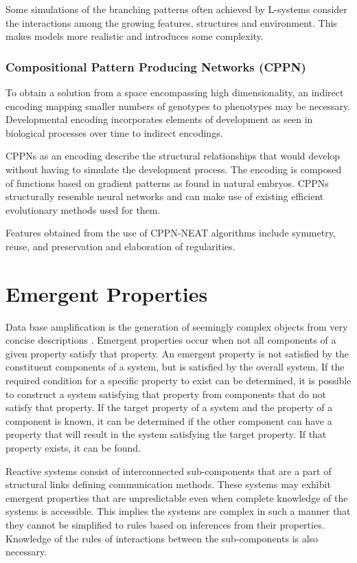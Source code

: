 Some simulations of the branching patterns often achieved by L-systems consider the interactions among the growing features, structures and environment. This makes models more realistic and introduces some complexity. \citep{Prusinkiewicz2004}

\subsubsection{Compositional Pattern Producing Networks (CPPN)}

To obtain a solution from a space encompassing high dimensionality, an indirect encoding mapping smaller numbers of genotypes to phenotypes may be necessary. Developmental encoding incorporates elements of development as seen in biological processes over time to indirect encodings. \citep{Hornby2001}

CPPNs as an encoding describe the structural relationships that would develop without having to simulate the development process. The encoding is composed of functions based on gradient patterns as found in natural embryos. CPPNs structurally resemble neural networks and can make use of existing efficient evolutionary methods used for them. \citep{Stanley2006}

Features obtained from the use of CPPN-NEAT algorithms include symmetry, reuse, and preservation and elaboration of regularities. \citep{Stanley2006}

\section{Emergent Properties}

Data base amplification is the generation of seemingly complex objects from very concise descriptions \citep{Prusinkiewicz2004}. Emergent properties occur when not all components of a given property satisfy that property. An emergent property is not satisfied by the constituent components of a system, but is satisfied by the overall system. If the required condition for a specific property to exist can be determined, it is possible to construct a system satisfying that property from components that do not satisfy that property. If the target property of a system and the property of a component is known, it can be determined if the other component can have a property that will result in the system satisfying the target property. If that property exists, it can be found. \citep{Zakinthinos1998}

Reactive systems consist of interconnected sub-components that are a part of structural links defining communication methods. These systems may exhibit emergent properties that are unpredictable even when complete knowledge of the systems is accessible. This implies the systems are complex in such a manner that they cannot be simplified to rules based on inferences from their properties. Knowledge of the rules of interactions between the sub-components is also necessary. \citep{Aiguier2008}

